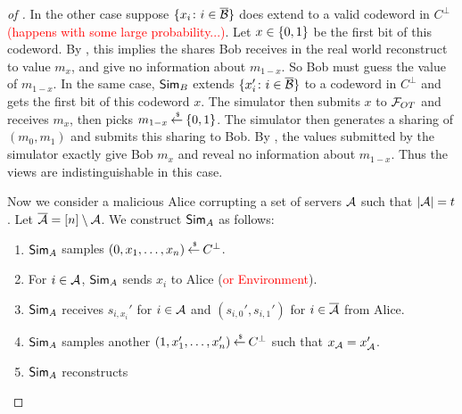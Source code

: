 \begin{proof}[of ]
	In the other case suppose $\{x_i \colon i \in \overline{{\mathcal B}} \}$ does extend to a valid codeword in $C^\perp$ \textcolor{red}{(happens with some large probability...)}.
	Let $x \in {\{0,1\}}$ be the first bit of this codeword.
	By , this implies the shares Bob receives in the real world reconstruct to value $m_x$, and give no information about $m_{1-x}$.
	So Bob must guess the value of $m_{1-x}$.
	In the same case, $\mathsf{Sim}_B$ extends $\{ x_i' \colon i \in \overline{{\mathcal B}} \}$ to a codeword in $C^\perp$ and gets the first bit of this codeword $x$.
	The simulator then submits $x$ to ${\mathcal F}_{OT}$ and receives $m_x$, then picks $m_{1-x} \mathbin{\stackrel{\mbox{\,\tiny \$}}{\gets}} {\{0,1\}}$.
	The simulator then generates a sharing of $(m_0, m_1)$ and submits this sharing to Bob.
	By , the values submitted by the simulator exactly give Bob $m_x$ and reveal no information about $m_{1-x}$.
	Thus the views are indistinguishable in this case.
	
	Now we consider a malicious Alice corrupting a set of servers ${\mathcal A}$ such that $|{\mathcal A}| = t$.
	Let $\overline{{\mathcal A}} = [n]\setminus{\mathcal A}$.
	We construct $\mathsf{Sim}_A$ as follows:
	\begin{enumerate}
		\item $\mathsf{Sim}_A$ samples $(0, x_1,\dotsc, x_n) \mathbin{\stackrel{\mbox{\,\tiny \$}}{\gets}} C^\perp$.
		\item For $i \in {\mathcal A}$, $\mathsf{Sim}_A$ sends $x_i$ to Alice (\textcolor{red}{or Environment}).
		\item $\mathsf{Sim}_A$ receives $s_{i,x_i}'$ for $i \in {\mathcal A}$ and $(s_{i,0}', s_{i,1}')$ for $i \in \overline{{\mathcal A}}$ from Alice.
		\item $\mathsf{Sim}_A$ samples another $(1, x_1', \dotsc, x_n') \mathbin{\stackrel{\mbox{\,\tiny \$}}{\gets}} C^\perp$ such that $x_{\mathcal A} = x'_{\mathcal A}$.
		\item $\mathsf{Sim}_A$ reconstructs 
	\end{enumerate}
\end{proof}





